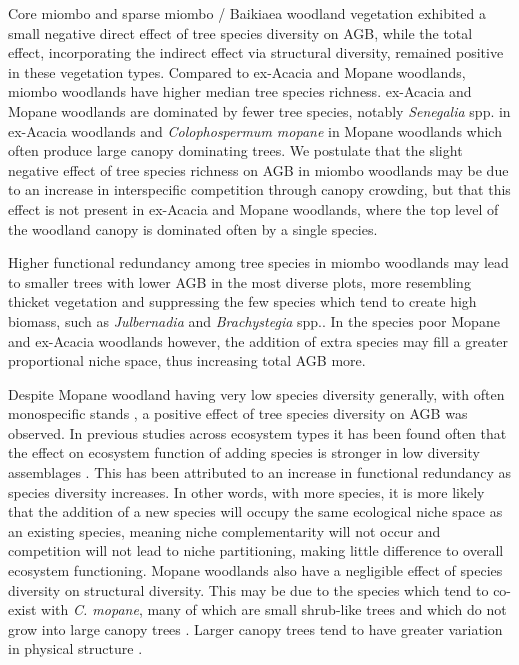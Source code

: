 \documentclass[11pt,a4paper]{article}
\begin{document}
Core miombo and sparse miombo / Baikiaea woodland vegetation exhibited a small negative direct effect of tree species diversity on AGB, while the total effect, incorporating the indirect effect via structural diversity, remained positive in these vegetation types. Compared to ex-Acacia and Mopane woodlands, miombo woodlands have higher median tree species richness. ex-Acacia and Mopane woodlands are dominated by fewer tree species, notably \textit{Senegalia} spp. in ex-Acacia woodlands and \textit{Colophospermum mopane} in Mopane woodlands which often produce large canopy dominating trees. We postulate that the slight negative effect of tree species richness on AGB in miombo woodlands may be due to an increase in interspecific competition through canopy crowding, but that this effect is not present in ex-Acacia and Mopane woodlands, where the top level of the woodland canopy is dominated often by a single species. 

Higher functional redundancy among tree species in miombo woodlands may lead to smaller trees with lower AGB in the most diverse plots, more resembling thicket vegetation and suppressing the few species which tend to create high biomass, such as \textit{Julbernadia} and \textit{Brachystegia} spp.. In the species poor Mopane and ex-Acacia woodlands however, the addition of extra species may fill a greater proportional niche space, thus increasing total AGB more. 

Despite Mopane woodland having very low species diversity generally, with often monospecific stands \citep{Timberlake2010}, a positive effect of tree species diversity on AGB was observed. In previous studies across ecosystem types it has been found often that the effect on ecosystem function of adding species is stronger in low diversity assemblages \citep{Hector2007}. This has been attributed to an increase in functional redundancy as species diversity increases. In other words, with more species, it is more likely that the addition of a new species will occupy the same ecological niche space as an existing species, meaning niche complementarity will not occur and competition will not lead to niche partitioning, making little difference to overall ecosystem functioning. Mopane woodlands also have a negligible effect of species diversity on structural diversity. This may be due to the species which tend to co-exist with \textit{C. mopane}, many of which are small shrub-like trees and which do not grow into large canopy trees \citep{Timberlake2010}. Larger canopy trees tend to have greater variation in physical structure \citep{Seidel2019}. 
\end{document}

